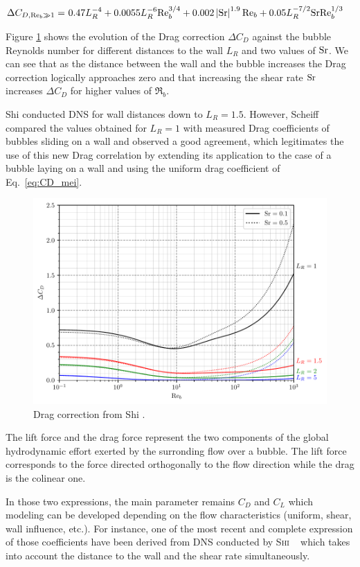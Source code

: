 \begin{align}
\Delta C_{D,{\mathrm{Re}_{b}\gg 1}} =& ~0.47L_{R}^{-4}+0.0055L_{R}^{-6}\mathrm{Re}_{b}^{3/4} 
+0.002 \left| \mathrm{Sr} \right|^{1.9} \mathrm{Re}_{b} + 0.05 L_{R}^{-7/2} \mathrm{Sr} \mathrm{Re}_{b}^{1/3}
\end{align}


Figure \ref{fig:CD_shi} shows the evolution of the Drag correction $\Delta C_{D}$ against the bubble Reynolds number for different distances to the wall $L_{R}$ and two values of $\mathrm{Sr}$.  We can see that as the distance between the wall and the bubble increases the Drag correction logically approaches zero and that increasing the shear rate $\mathrm{Sr}$ increases $\Delta C_{D}$ for higher values of $\Re_{b}$.

\npar

Shi \etal \cite{shi_drag_2021} conducted DNS for wall distances down to $L_{R}=1.5$. However, Scheiff \etal \cite{scheiff_experimental_2021} compared the values obtained for $L_{R}=1$  with measured Drag coefficients of bubbles sliding on a wall and observed a good agreement, which legitimates the use of this new Drag correlation by extending its application to the case of a bubble laying on a wall and using the uniform drag coefficient of Eq.~\ref{eq:CD_mei}.


\begin{figure}[h!]
\centering
\includegraphics[width=0.6\linewidth]{img/forces/corr_drag.pdf}
\caption{Drag correction from Shi \etal \cite{shi_drag_2021}.}
\label{fig:CD_shi}
\end{figure}


The lift force and the drag force represent the two components of the global hydrodynamic effort exerted by the surronding flow over a bubble. The lift force corresponds to the force directed orthogonally to the flow direction while the drag is the colinear one. 


In those two expressions, the main parameter remains $C_{D}$ and $C_{L}$ which modeling can be developed depending on the flow characteristics (uniform, shear, wall influence, etc.). For instance, one of the most recent and complete expression of those coefficients have been derived from DNS conducted by \textsc{Shi} \etal~ which takes into account the distance to the wall and the shear rate simultaneously.



